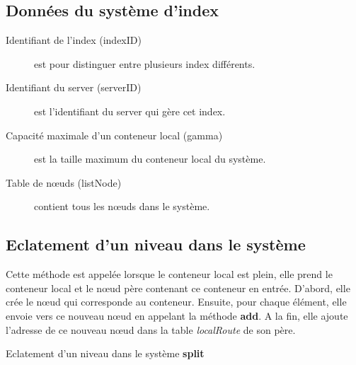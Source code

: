 \documentclass[a4paper,11pt]{report}
\begin{document}
\subsection{Données du système d'index}	
\begin{description}
	\item[Identifiant de l'index (indexID)] est pour distinguer entre plusieurs index différents.
	\item[Identifiant du server (serverID)] est l'identifiant du server qui gère cet index.
	\item[Capacité maximale d'un conteneur local (gamma)] est la taille maximum du conteneur local du système.
	\item[Table de nœuds (listNode)] contient tous les nœuds dans le système.
\end{description}		
	
	
\subsection{Eclatement d'un niveau dans le système}
	Cette méthode est appelée lorsque le conteneur local est plein, elle prend le conteneur local et le nœud père contenant ce conteneur en entrée.
	D'abord, elle crée le nœud qui corresponde au conteneur. Ensuite, pour chaque élément, elle envoie vers ce nouveau nœud en appelant la méthode \textbf{add}. A la fin, elle ajoute l'adresse de ce nouveau nœud dans la table \textit{localRoute} de son père.
	
\newpage
\begin{algorithme}
	Eclatement d'un niveau dans le système \textbf{split}
\end{algorithme}
\end{document}

